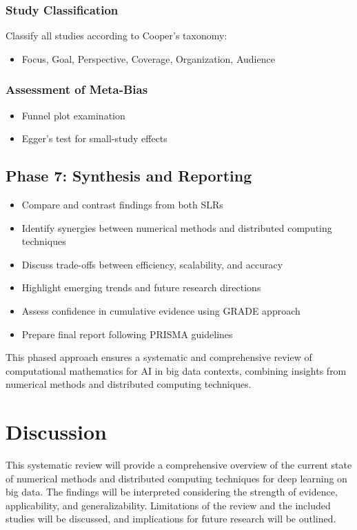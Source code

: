 \documentclass[a4paper,12pt]{article}
\begin{document}
\subsubsection{Study Classification}
Classify all studies according to Cooper's taxonomy:
\begin{itemize}
    \item Focus, Goal, Perspective, Coverage, Organization, Audience
\end{itemize}

\subsubsection{Assessment of Meta-Bias}
\begin{itemize}
    \item Funnel plot examination
    \item Egger's test for small-study effects
\end{itemize}

\subsection{Phase 7: Synthesis and Reporting}

\begin{itemize}
    \item Compare and contrast findings from both SLRs
    \item Identify synergies between numerical methods and distributed computing techniques
    \item Discuss trade-offs between efficiency, scalability, and accuracy
    \item Highlight emerging trends and future research directions
    \item Assess confidence in cumulative evidence using GRADE approach
    \item Prepare final report following PRISMA guidelines
\end{itemize}

This phased approach ensures a systematic and comprehensive review of computational mathematics for AI in big data contexts, combining insights from numerical methods and distributed computing techniques.

\section{Discussion}
This systematic review will provide a comprehensive overview of the current state of numerical methods and distributed computing techniques for deep learning on big data. The findings will be interpreted considering the strength of evidence, applicability, and generalizability. Limitations of the review and the included studies will be discussed, and implications for future research will be outlined.



\end{document}

